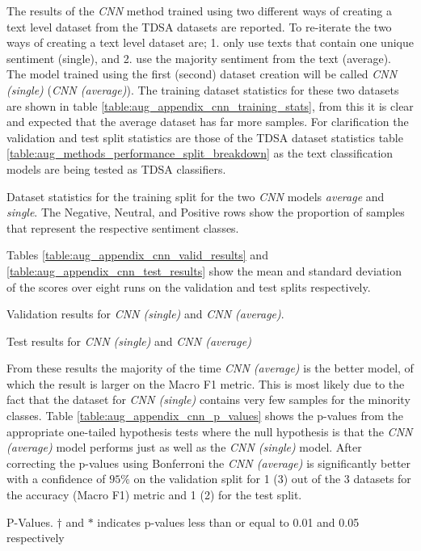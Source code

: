 The results of the \textit{CNN} method trained using two different ways of creating a text level dataset from the TDSA datasets are reported. To re-iterate the two ways of creating a text level dataset are; 1. only use texts that contain one unique sentiment (single), and 2. use the majority sentiment from the text (average). The model trained using the first (second) dataset creation will be called \textit{CNN (single)} (\textit{CNN (average)}). The training dataset statistics for these two datasets are shown in table \ref{table:aug_appendix_cnn_training_stats}, from this it is clear and expected that the average dataset has far more samples. For clarification the validation and test split statistics are those of the TDSA dataset statistics table \ref{table:aug_methods_performance_split_breakdown} as the text classification models are being tested as TDSA classifiers.
\begin{table}[ht!]
    \centering
    
    \caption{Dataset statistics for the training split for the two \textit{CNN} models \textit{average} and \textit{single}. The Negative, Neutral, and Positive rows show the proportion of samples that represent the respective sentiment classes.}
    \label{table:aug_appendix_cnn_training_stats}
\end{table}

Tables \ref{table:aug_appendix_cnn_valid_results} and \ref{table:aug_appendix_cnn_test_results} show the mean and standard deviation of the scores over eight runs on the validation and test splits respectively.

\begin{table}[ht!]
    \centering
    
    \caption{Validation results for \textit{CNN (single)} and \textit{CNN (average)}.}
    \label{table:aug_appendix_cnn_valid_results}
\end{table}

\begin{table}[ht!]
    \centering
    
    \caption{Test results for \textit{CNN (single)} and \textit{CNN (average)}}
    \label{table:aug_appendix_cnn_test_results}
\end{table}

From these results the majority of the time \textit{CNN (average)} is the better model, of which the result is larger on the Macro F1 metric. This is most likely due to the fact that the dataset for \textit{CNN (single)} contains very few samples for the minority classes. Table \ref{table:aug_appendix_cnn_p_values} shows the p-values from the appropriate one-tailed hypothesis tests where the null hypothesis is that the \textit{CNN (average)} model performs just as well as the \textit{CNN (single)} model. After correcting the p-values using Bonferroni the \textit{CNN (average)} is significantly better with a confidence of $95\%$ on the validation split for 1 (3) out of the 3 datasets for the accuracy (Macro F1) metric and 1 (2) for the test split.   

\begin{table}[ht!]
    \centering
    
    \caption{P-Values. $\dagger$ and $\ast$ indicates p-values less than or equal to 0.01 and 0.05 respectively }
    \label{table:aug_appendix_cnn_p_values}
\end{table}